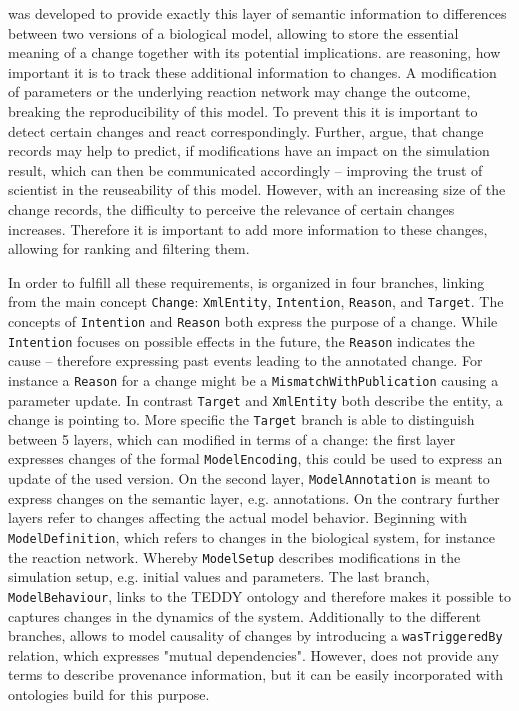 	\comodi was developed to provide exactly this layer of semantic information to differences between two versions of a biological model, allowing to store the essential meaning of a change together with its potential implications.
	\citeauthor{Scharm2016} are reasoning, how important it is to track these additional information to changes. A modification of parameters or the underlying reaction network may change the outcome, breaking the reproducibility of this model. To prevent this it is important to detect certain changes and 
	react correspondingly.
	Further, \citeauthor{Scharm2016} argue, that change records may help to predict, if modifications have an impact on the simulation result, which can then be communicated accordingly -- improving the trust of scientist in the reuseability of this model.
	However, with an increasing size of the change records, the difficulty to perceive the relevance of certain changes increases. Therefore it is important to add more information to these changes, allowing for ranking and filtering them.
	
	In order to fulfill all these requirements, \comodi is organized in four branches, linking from the main concept \texttt{Change}: \texttt{XmlEntity}, \texttt{Intention}, \texttt{Reason}, and \texttt{Target}.
	The concepts of \texttt{Intention} and \texttt{Reason} both express the purpose of a change. While \texttt{Intention} focuses on possible effects in the future, the \texttt{Reason} indicates the cause -- therefore expressing past events leading to the annotated change. For instance a \texttt{Reason} for a change might be a \texttt{MismatchWithPublication} causing a parameter update.
	In contrast \texttt{Target} and \texttt{XmlEntity} both describe the entity, a change is pointing to.
	More specific the \texttt{Target} branch is able to distinguish between 5 layers, which can modified in terms of a change: the first layer expresses changes of the formal \texttt{ModelEncoding}, this could be used to express an update of the used \sbml version.
	On the second layer, \texttt{ModelAnnotation} is meant to express changes on the semantic layer, e.g. annotations. 
	On the contrary further layers refer to changes affecting the actual model behavior. Beginning with \texttt{ModelDefinition}, which refers to changes in the biological system, for instance the reaction network. Whereby \texttt{ModelSetup} describes modifications in the simulation setup, e.g. initial values and parameters. The last branch, \texttt{ModelBehaviour}, links to the TEDDY ontology \citep{Courtot2011} and therefore makes it possible to captures changes in the dynamics of the system.
	Additionally to the different branches, \comodi allows to model causality of changes by introducing a \texttt{wasTriggeredBy} relation, which expresses "mutual dependencies". However, \comodi does not provide any terms to describe provenance information, but it can be easily incorporated with ontologies build for this purpose.
	
